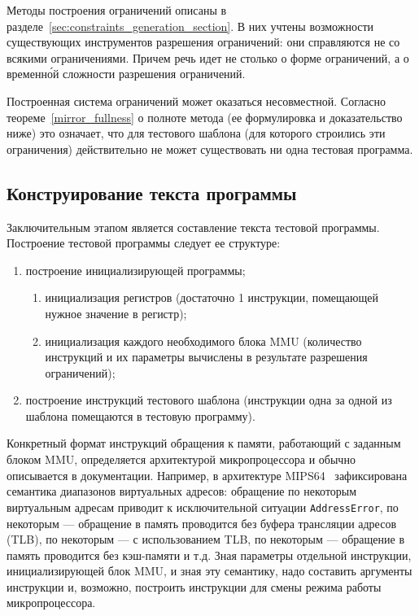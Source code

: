 Методы построения ограничений описаны в разделе~\ref{sec:constraints_generation_section}. В них учтены возможности существующих инструментов разрешения ограничений: они справляются не со всякими ограничениями. Причем речь идет не столько о форме ограничений, а о временн\'{о}й сложности разрешения ограничений.

Построенная система ограничений может оказаться несовместной. Согласно теореме~\ref{mirror_fullness} о полноте метода (ее формулировка и доказательство ниже) это означает, что для тестового шаблона (для которого строились эти ограничения) действительно не может существовать ни одна тестовая программа.

\subsection{Конструирование текста программы}

Заключительным этапом является составление текста тестовой программы.  Построение тестовой программы следует ее структуре:
\begin{enumerate}
  \item построение инициализирующей программы;
        \begin{enumerate}
          \item инициализация регистров (достаточно 1 инструкции, помещающей нужное значение в регистр);
          \item инициализация каждого необходимого блока MMU (количество инструкций и их параметры вычислены в результате разрешения ограничений);
        \end{enumerate}
  \item построение инструкций тестового шаблона (инструкции одна за одной из шаблона помещаются в тестовую программу).
\end{enumerate}

Конкретный формат инструкций обращения к памяти, работающий с заданным блоком MMU, определяется архитектурой микропроцессора и обычно описывается в документации. Например, в архитектуре MIPS64~\cite{mips64_III} зафиксирована семантика диапазонов виртуальных адресов: обращение по некоторым виртуальным адресам приводит к исключительной ситуации \texttt{AddressError}, по некоторым --- обращение в память проводится без буфера трансляции адресов (TLB), по некоторым --- с использованием TLB, по некоторым --- обращение в память проводится без кэш-памяти и т.д. Зная параметры отдельной инструкции, инициализирующей блок MMU, и зная эту семантику, надо составить аргументы инструкции и, возможно, построить инструкции для смены режима работы микропроцессора.

